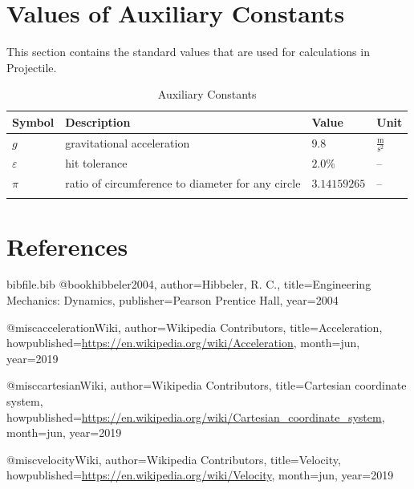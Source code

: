 \documentclass[12pt]{article}
\begin{document}
\section{Values of Auxiliary Constants}
\label{Sec:AuxConstants}
This section contains the standard values that are used for calculations in Projectile.
\begin{longtable}{l l l l}
\toprule
\textbf{Symbol} & \textbf{Description} & \textbf{Value} & \textbf{Unit}
\\
\midrule
\endhead
$g$ & gravitational acceleration & $9.8$ & $\frac{\text{m}}{\text{s}^{2}}$
\\
$ε$ & hit tolerance & $2.0\%$ & --
\\
$π$ & ratio of circumference to diameter for any circle & $3.14159265$ & --
\\
\bottomrule
\caption{Auxiliary Constants}
\label{Table:TAuxConsts}
\end{longtable}
\section{References}
\label{Sec:References}
\begin{filecontents*}{bibfile.bib}
@book{hibbeler2004,
author={Hibbeler, R. C.},
title={Engineering Mechanics: Dynamics},
publisher={Pearson Prentice Hall},
year={2004}}

@misc{accelerationWiki,
author={Wikipedia Contributors},
title={Acceleration},
howpublished={\url{https://en.wikipedia.org/wiki/Acceleration}},
month=jun,
year={2019}}

@misc{cartesianWiki,
author={Wikipedia Contributors},
title={Cartesian coordinate system},
howpublished={\url{https://en.wikipedia.org/wiki/Cartesian\_coordinate\_system}},
month=jun,
year={2019}}

@misc{velocityWiki,
author={Wikipedia Contributors},
title={Velocity},
howpublished={\url{https://en.wikipedia.org/wiki/Velocity}},
month=jun,
year={2019}}
\end{filecontents*}
\nocite{*}
\printbibliography[heading=none]
\end{document}
